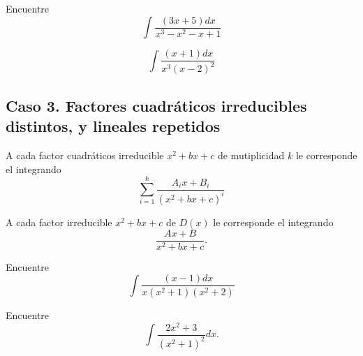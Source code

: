 \begin{resuelto}
	\label{ayr:exmp:33.7}
	Encuentre $$
	\int\dfrac{(3x+5)dx}{x^{3}-x^{2}-x+1}
	$$
\end{resuelto}




\begin{resuelto}
	\label{ayr:33.8}
	$$
	\int \dfrac{(x+1)dx}{x^{3}(x-2)^{2}}
	$$
\end{resuelto}


\subsection{Caso 3. Factores cuadráticos irreducibles distintos, y lineales repetidos}






 A cada factor cuadráticos irreducible $x^{2}+bx+c$ de mutiplicidad $k$ le corresponde el integrando
 $$
 \sum_{i=1}^{k}\dfrac{A_{i}x+B_{i}}{(x^{2}+bx+c)^{i}}
 $$

 A cada factor irreducible $x^{2}+bx+c$ de $D(x)$ le corresponde el integrando
$$
\dfrac{Ax+B}{x^{2}+bx+c}.
$$



\begin{resuelto}
	Encuentre $$
	\int \dfrac{(x-1)dx}{x(x^{2}+1)(x^{2}+2)}
	$$
\end{resuelto}


 \begin{resuelto}
  Encuentre $$\int\dfrac{2x^{2}+3}{(x^{2}+1)^{2}}dx.$$
 \end{resuelto}


